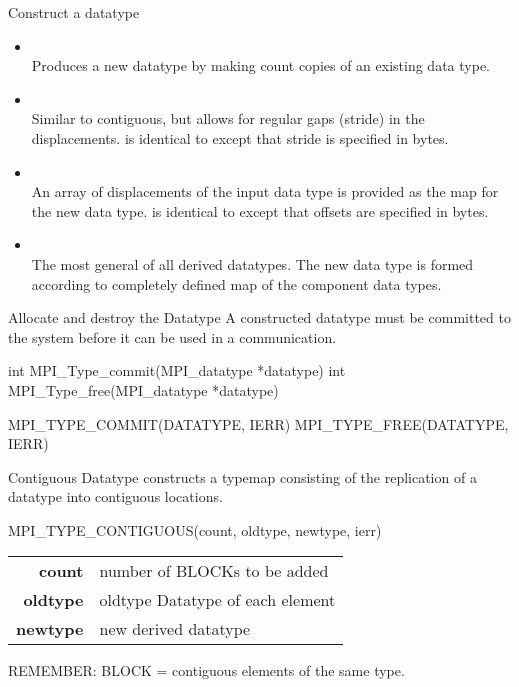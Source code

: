 \documentclass[aspectratio=43]{beamer}
\begin{document}
\begin{frame}[fragile]{Construct a datatype}
\begin{itemize}
\item {}\\
Produces a new datatype by making count copies of an existing data type.

\item {}\\
Similar to contiguous, but allows for regular gaps (stride) in the displacements.
 is identical to  except that stride is specified in bytes.

\item {}\\
An array of displacements of the input data type is provided as the map for the new data type.
 is identical to  except that offsets are specified in bytes.

\item {}\\
The most general of all derived datatypes. The new data type is formed according to completely defined map of the component data types.
\end{itemize}

\end{frame}

\begin{frame}[fragile]{Allocate and destroy the Datatype}
A constructed datatype must be committed to the system before it can be used in a communication.\\
\begin{Cpplisting}[]{}
int MPI_Type_commit(MPI_datatype *datatype)
int MPI_Type_free(MPI_datatype *datatype)
\end{Cpplisting}
\begin{Fortranlisting}[]{}
MPI_TYPE_COMMIT(DATATYPE, IERR)
MPI_TYPE_FREE(DATATYPE, IERR)
\end{Fortranlisting}
\end{frame}

\begin{frame}[fragile]{Contiguous Datatype}
 constructs a typemap consisting of the replication of a datatype into contiguous locations.
\begin{Fortranlisting}[]{}
MPI_TYPE_CONTIGUOUS(count, oldtype, newtype, ierr)
\end{Fortranlisting}
\begin{black1block}{}
\begin{tabular}{rp{8cm}}
\textbf{count} & number of BLOCKs to be added\\
\textbf{oldtype} & oldtype Datatype of each element\\
\textbf{newtype} & new derived datatype\\
\end{tabular}
\end{black1block}
REMEMBER: BLOCK = contiguous elements of the same type.
\end{frame}
\end{document}
